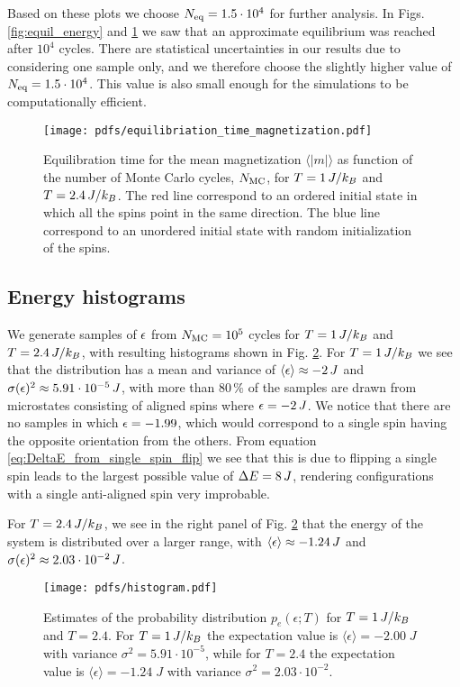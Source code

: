 Based on these plots we choose $N_\mathrm{eq}=1.5\cdot10^4$ for further analysis. In Figs. \ref{fig:equil_energy} and \ref{fig:equil_magn} we saw that an approximate equilibrium was reached after $10^4$ cycles. There are statistical uncertainties in our results due to considering one sample only, and we therefore choose the slightly higher value of $N_\mathrm{eq}=1.5\cdot10^4$. This value is also small enough for the simulations to be computationally efficient.

\begin{figure}[!ht]
    \texttt{[image: pdfs/equilibriation\_time\_magnetization.pdf]}
    \caption{Equilibration time for the mean magnetization $\langle \vert m \vert \rangle$ as function of the number of Monte Carlo cycles, $N_\mathrm{MC}$, for $T=1\,J/k_B$ and $T=2.4\,J/k_B$. The red line correspond to an ordered initial state in which all the spins point in the same direction. The blue line correspond to an unordered initial state with random initialization of the spins.}
    \label{fig:equil_magn}
\end{figure}

\subsection{Energy histograms}\label{subsec_results:histogram}
We generate samples of $\epsilon$ from $N_\mathrm{MC}=10^5$ cycles for $T=1\,J/k_B$ and $T=2.4\,J/k_B$, with resulting histograms shown in Fig. \ref{fig:histogram}. For $T=1\,J/k_B$ we see that the distribution has a mean and variance of $\expval{\epsilon}\approx-2\,J$ and $\sigma(\epsilon)^2\approx5.91\cdot10^{-5}\,J$, with more than $80\,\%$ of the samples are drawn from microstates consisting of aligned spins where $\epsilon=-2\,J$. We notice that there are no samples in which $\epsilon=-1.99$, which would correspond to a single spin having the opposite orientation from the others. From equation \eqref{eq:DeltaE_from_single_spin_flip} we see that this is due to flipping a single spin leads to the largest possible value of $\Delta E=8\,J$, rendering configurations with a single anti-aligned spin very improbable.

For $T=2.4\,J/k_B$, we see in the right panel of Fig. \ref{fig:histogram} that the energy of the system is distributed over a larger range, with $\expval{\epsilon}\approx-1.24\,J$ and $\sigma(\epsilon)^2 \approx2.03\cdot10^{-2}\,J$. 
\begin{figure}[!ht]
    \texttt{[image: pdfs/histogram.pdf]}
    \caption{Estimates of the probability distribution $p_e(\epsilon; T)$ for $T=1\,J/k_B$ and $T=2.4$. For $T=1\,J/k_B$ the expectation value is $\langle \epsilon \rangle = -2.00 \; J$ with variance $\sigma^2 = 5.91\cdot 10^{-5}$, while for $T=2.4$ the expectation value is $\langle \epsilon \rangle = -1.24 \; J$ with variance $\sigma^2=2.03\cdot 10^{-2}$.}
    \label{fig:histogram}
\end{figure}

